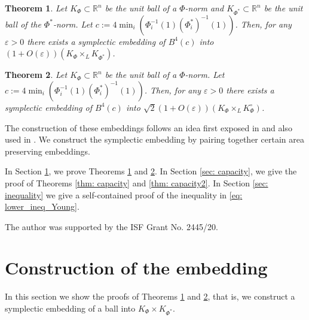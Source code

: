 \documentclass{article}
\newtheorem{theorem}{Theorem}[section]
\theoremstyle{definition}
\begin{document}
\begin{theorem}\label{thm: embedding}
Let $K_{\Phi}\subset \mathbb{R}^n$ be the unit ball of a $\Phi$-norm and $K_{\Phi^*}\subset \mathbb{R}^n$ be the unit ball of the $\Phi^*$-norm. Let $c:=4\min_i(\Phi_i^{-1}(1){(\Phi^*_i)}^{-1}(1))$. Then, for any $\varepsilon>0$ there exists a symplectic embedding of  $B^{4}(c)$ into $(1+O(\varepsilon))(K_{\Phi}\times_L K_{\Phi^*})$. 
\end{theorem}

\begin{theorem}\label{thm: embedding2}
Let $K_{\Phi}\subset \mathbb{R}^n$ be the unit ball of a $\Phi$-norm. Let $c:=4\min_i(\Phi_i^{-1}(1){(\Phi^*_i)}^{-1}(1))$. Then, for any $\varepsilon>0$ there exists a symplectic embedding of  $B^{4}(c)$ into $\sqrt{2}(1+O(\varepsilon))(K_{\Phi}\times_L K_{\Phi}^{\circ})$. 
\end{theorem}

  

The construction of these embeddings follows an idea first exposed in \cite{Latschev2011TheGW} and also used in \cite{Karasev2019MahlersCF}. We construct the symplectic embedding by pairing together certain area preserving embeddings.


 In Section \ref{sec: construction}, we prove Theorems \ref{thm: embedding} and \ref{thm: embedding2}. In Section \ref{sec: capacity}, we give the proof of Theorems \ref{thm: capacity} and \ref{thm: capacity2}. In Section \ref{sec: inequality} we give a self-contained proof of the inequality in \eqref{eq: lower_ineq_Young}.

 The author was supported by the ISF Grant No. 2445/20.


\section{Construction of the embedding}\label{sec: construction}
In this section we show the proofs of Theorems \ref{thm: embedding} and \ref{thm: embedding2}, that is, we construct a symplectic embedding of a ball into $K_{\Phi}\times K_{\Phi^*}$.  
  
\end{document}
